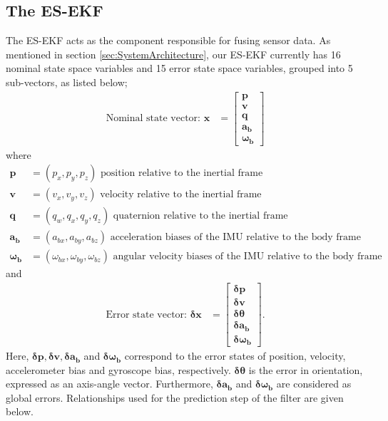 \subsection{The \acrlong{ES-EKF}}
The \gls{ES-EKF} acts as the component responsible for fusing sensor data. As mentioned in section \ref{sec:SystemArchitecture}, our \gls{ES-EKF} currently has 16 nominal state space variables and 15 error state space variables, grouped into 5 sub-vectors, as listed below;
\begin{align}
    \text{Nominal state vector: }\textbf{x} &= \left[\begin{matrix}{}\textbf{p}\\\textbf{v}\\\textbf{q}\\\boldsymbol{a_b}\\\boldsymbol{\omega_b}\end{matrix}\right]
\end{align}
where
\begin{align}
    \textbf{p} &= (p_x, p_y, p_z) \text{ position relative to the inertial frame} \nonumber \\
    \textbf{v} &= (v_x, v_y, v_z) \text{ velocity relative to the inertial frame} \nonumber \\
    \textbf{q} &= (q_w, q_x, q_y, q_z) \text{ quaternion relative to the inertial frame} \nonumber \\
    \boldsymbol{a_b} &= (a_{bx}, a_{by}, a_{bz}) \text{ acceleration biases of the IMU relative to the body frame} \nonumber \\
    \boldsymbol{\omega_b} &= (\omega_{bx}, \omega_{by}, \omega_{bz}) \text{ angular velocity biases of the IMU relative to the body frame}\nonumber
\end{align}
and
\begin{align}
	\text{Error state vector: }\boldsymbol{\delta}\textbf{x} &= \left[\begin{matrix}{}\boldsymbol{\delta}\textbf{p}\\\boldsymbol{\delta}\textbf{v}\\\boldsymbol{\delta}\boldsymbol{\theta}\\\boldsymbol{\delta}\boldsymbol{a_b}\\\boldsymbol{\delta}\boldsymbol{\omega_b}\end{matrix}\right].
\end{align}
Here, $\boldsymbol{\delta}\textbf{p}, \boldsymbol{\delta}\textbf{v}, \boldsymbol{\delta}\boldsymbol{a_b}$ and $\boldsymbol{\delta}\boldsymbol{\omega_b}$ correspond to the error states of position, velocity, accelerometer bias and gyroscope bias, respectively. $\boldsymbol{\delta}\boldsymbol{\theta}$ is the error in orientation, expressed as an axis-angle vector. Furthermore, $\boldsymbol{\delta}\boldsymbol{a_b}$ and $\boldsymbol{\delta}\boldsymbol{\omega_b}$ are considered as global errors. Relationships used for the prediction step of the filter are given below.\\
